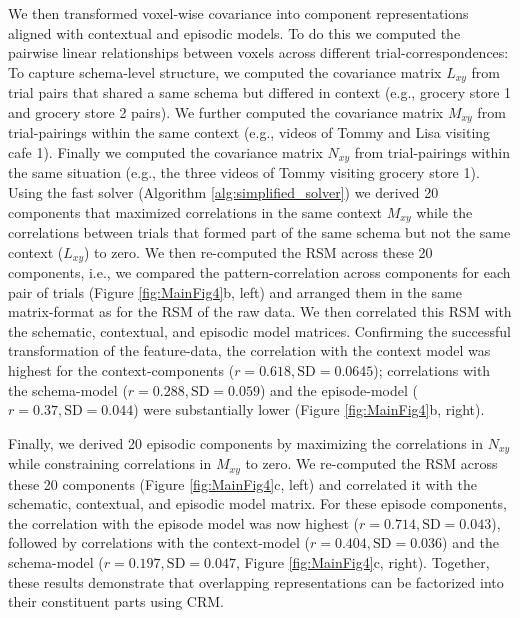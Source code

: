 \documentclass{article}
\begin{document}
We then transformed voxel-wise covariance into component representations aligned with contextual and episodic models. To do this we computed the pairwise linear relationships between voxels across different trial-correspondences: To capture schema-level structure, we computed the covariance matrix $L_{xy}$ from trial pairs that shared a same schema but differed in context (e.g., grocery store 1 and grocery store 2 pairs).  We further computed the covariance matrix $M_{xy}$ from trial-pairings within the same context (e.g., videos of Tommy and Lisa visiting cafe 1). Finally we computed the covariance matrix $N_{xy}$ from trial-pairings within the same situation (e.g., the three videos of Tommy visiting grocery store 1).  Using the fast solver (Algorithm \ref{alg:simplified_solver}) we derived 20 components that maximized correlations in the same context $M_{xy}$ while the correlations between trials that formed part of the same schema but not the same context ($L_{xy}$) to zero. We then re-computed the RSM across these 20 components, i.e., we compared the pattern-correlation across components for each pair of trials (Figure \ref{fig:MainFig4}b, left) and arranged them in the same matrix-format as for the RSM of the raw data. We then correlated this RSM with the schematic, contextual, and episodic model matrices. Confirming the successful transformation of the feature-data, the correlation with the context model was highest for the context-components ($r= 0.618, \text{SD} = 0.0645$); correlations with the schema-model ($r= 0.288, \text{SD} = 0.059$) and the episode-model ($r= 0.37, \text{SD} = 0.044$) were substantially lower (Figure \ref{fig:MainFig4}b, right).

Finally, we derived 20 episodic components by maximizing the correlations in $N_{xy}$ while constraining correlations in $M_{xy}$ to zero. We re-computed the RSM across these 20 components (Figure \ref{fig:MainFig4}c, left) and correlated it with the schematic, contextual, and episodic model matrix. For these episode components, the correlation with the episode model was now highest ($r= 0.714, \text{SD} = 0.043$), followed by correlations with the context-model ($r= 0.404, \text{SD} = 0.036$) and the schema-model ($r= 0.197, \text{SD} = 0.047$, Figure \ref{fig:MainFig4}c, right). Together, these results demonstrate that overlapping representations can be factorized into their constituent parts using CRM.
\end{document}
